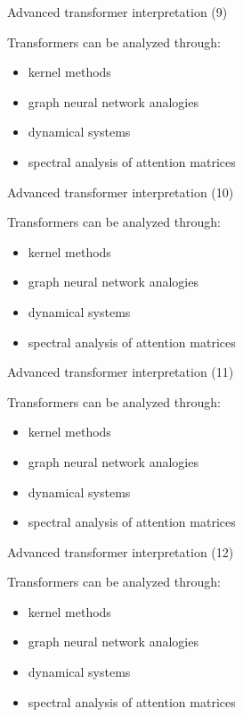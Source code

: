 \documentclass[aspectratio=169]{beamer}
\begin{document}
\begin{frame}{Advanced transformer interpretation (9)}

Transformers can be analyzed through:

\begin{itemize}
\item kernel methods
\item graph neural network analogies
\item dynamical systems
\item spectral analysis of attention matrices
\end{itemize}

\end{frame}


\begin{frame}{Advanced transformer interpretation (10)}

Transformers can be analyzed through:

\begin{itemize}
\item kernel methods
\item graph neural network analogies
\item dynamical systems
\item spectral analysis of attention matrices
\end{itemize}

\end{frame}


\begin{frame}{Advanced transformer interpretation (11)}

Transformers can be analyzed through:

\begin{itemize}
\item kernel methods
\item graph neural network analogies
\item dynamical systems
\item spectral analysis of attention matrices
\end{itemize}

\end{frame}


\begin{frame}{Advanced transformer interpretation (12)}

Transformers can be analyzed through:

\begin{itemize}
\item kernel methods
\item graph neural network analogies
\item dynamical systems
\item spectral analysis of attention matrices
\end{itemize}

\end{frame}
\end{document}
